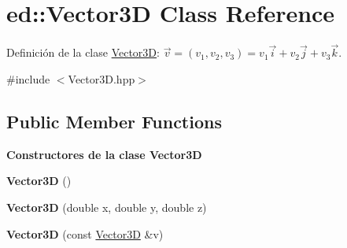 \hypertarget{classed_1_1Vector3D}{}\section{ed\+:\+:Vector3D Class Reference}
\label{classed_1_1Vector3D}


Definición de la clase \hyperlink{classed_1_1Vector3D}{Vector3D}\+: $ \vec{v} = (v_1, v_2, v_3) = v_1 \vec{i} + v_2 \vec{j} + v_3 \vec{k} $.  




{\ttfamily \#include $<$Vector3\+D.\+hpp$>$}

\subsection*{Public Member Functions}
\begin{Indent}{\bf Constructores de la clase Vector3D}\par
\begin{DoxyCompactItemize}
\item 
{\bfseries Vector3D} ()\hypertarget{classed_1_1Vector3D_a6747bbbfd5d1fac542e46315aed209e5}{}\label{classed_1_1Vector3D_a6747bbbfd5d1fac542e46315aed209e5}

\item 
{\bfseries Vector3D} (double x, double y, double z)\hypertarget{classed_1_1Vector3D_a094c484e0111ab28c5deaa754e928eb0}{}\label{classed_1_1Vector3D_a094c484e0111ab28c5deaa754e928eb0}

\item 
{\bfseries Vector3D} (const \hyperlink{classed_1_1Vector3D}{Vector3D} \&v)\hypertarget{classed_1_1Vector3D_a36ea6289d040b55a2156c21e4359e861}{}\label{classed_1_1Vector3D_a36ea6289d040b55a2156c21e4359e861}

\end{DoxyCompactItemize}
\end{Indent}
